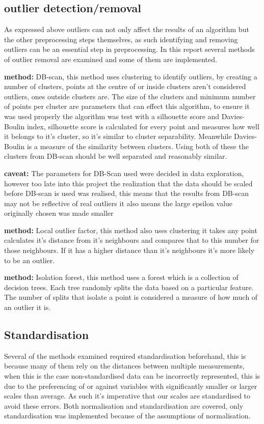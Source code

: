 \documentclass[a4paper]{article}
\begin{document}
\subsection{outlier detection/removal}

As expressed above outliers can not only affect the results of an algorithm but the other preprocessing steps themselves, as such identifying and removing outliers can be an essential step in preprocessing. In this report several methods of outlier removal are examined and some of them are implemented. 

\textbf{method:} DB-scan, this method uses clustering to identify outliers, by creating a number of clusters, points at the centre of or inside clusters aren't considered outliers, ones outside clusters are. The size of the clusters and minimum number of points per cluster are parameters that can effect this algorithm, to ensure it was used properly the algorithm was test with a silhouette score and Davies-Boulin index, silhouette score is calculated for every point and measures how well it belongs to it's cluster, so it's similar to cluster separability. Meanwhile Davies-Boulin is a measure of the similarity between clusters. Using both of these the clusters from DB-scan should be well separated and reasonably similar.

\textbf{caveat:} The parameters for DB-Scan used were decided in data exploration, however too late into this project the realization that the data should be scaled before DB-scan is used was realised, this means that the results from DB-scan may not be reflective of real outliers it also means the large epsilon value originally chosen was made smaller

\textbf{method:} Local outlier factor, this method also uses clustering it takes any point calculates it's distance from it's neighbours and compares that to this number for those neighbours. If it has a higher distance than it's neighbours it's more likely to be an outlier.

\textbf{method:} Isolation forest, this method uses a forest which is a collection of decision trees. Each tree randomly splits the data based on a particular feature. The number of splits that isolate a point is considered a measure of how much of an outlier it is.

\subsection{Standardisation}
Several of the methods examined required standardisation beforehand, this is because many of them rely on the distances between multiple measurements, when this is the case non-standardised data can be incorrectly represented, this is due to the preferencing of or against variables with significantly smaller or larger scales than average. As such it's imperative that our scales are standardised to avoid these errors. Both normalisation and standardisation are covered, only standardisation was implemented because of the assumptions of normalisation.
\end{document}

